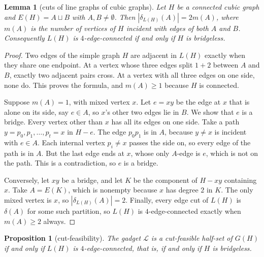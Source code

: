 \documentclass[11pt]{amsart}
\newtheorem{lemma}[theorem]{Lemma}
\newtheorem{proposition}[theorem]{Proposition}
\theoremstyle{definition}
\begin{document}
\begin{lemma}[cuts of line graphs of cubic graphs]\label{lem:linecuts}
Let $H$ be a connected cubic graph and $E(H)=A\sqcup B$ with $A,B\ne\emptyset$. Then
$|\delta_{L(H)}(A)|=2m(A)$, where $m(A)$ is the number of vertices of $H$ incident with edges of both
$A$ and $B$. Consequently $L(H)$ is $4$-edge-connected if and only if $H$ is bridgeless.
\end{lemma}

\begin{proof}
Two edges of the simple graph $H$ are adjacent in $L(H)$ exactly when they share one endpoint. At a
vertex whose three edges split $1+2$ between $A$ and $B$, exactly two adjacent pairs cross. At a
vertex with all three edges on one side, none do. This proves the formula, and $m(A)\ge1$ because $H$
is connected.

Suppose $m(A)=1$, with mixed vertex $x$. Let $e=xy$ be the edge at $x$ that is alone on its side,
say $e\in A$, so $x$'s other two edges lie in $B$. We show that $e$ is a bridge. Every vertex other
than $x$ has all its edges on one side. Take a path $y=p_0,p_1,\dots,p_t=x$ in $H-e$. The edge
$p_0p_1$ is in $A$, because $y\ne x$ is incident with $e\in A$. Each internal vertex $p_i\ne x$
passes the side on, so every edge of the path is in $A$. But the last edge ends at $x$, whose only
$A$-edge is $e$, which is not on the path. This is a contradiction, so $e$ is a bridge.

Conversely, let $xy$ be a bridge, and let $K$ be the component of $H-xy$ containing $x$. Take $A=E(K)$,
which is nonempty because $x$ has degree $2$ in $K$. The only mixed vertex is $x$, so
$|\delta_{L(H)}(A)|=2$. Finally, every edge cut of $L(H)$ is $\delta(A)$ for some such partition, so
$L(H)$ is $4$-edge-connected exactly when $m(A)\ge2$ always.
\end{proof}

\begin{proposition}[cut-feasibility]\label{prop:Lfeasible}
The gadget $\mathcal L$ is a cut-feasible half-set of $G(H)$ if and only if $L(H)$ is
$4$-edge-connected, that is, if and only if $H$ is bridgeless.
\end{proposition}
\end{document}
